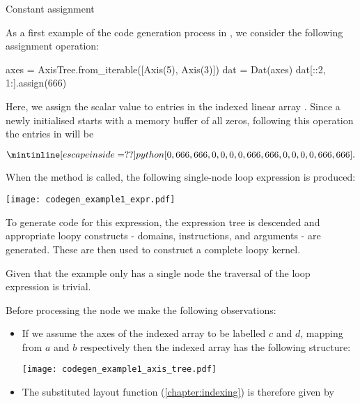 \documentclass[thesis]{subfiles}
\begin{document}
\begin{example}{Constant assignment}
\label{example:assign_codegen}

As a first example of the code generation process in , we consider the following assignment operation:

\begin{pyinline}
  axes = AxisTree.from_iterable([Axis(5), Axis(3)])
  dat = Dat(axes)
  dat[::2, 1:].assign(666)
\end{pyinline}

\noindent
Here, we assign the scalar value  to entries in the indexed linear array .
Since a newly initialised  starts with a memory buffer of all zeros, following this operation the entries in  will be

\begin{equation*}
  \pycode{[0, 666, 666, 0, 0, 0, 0, 666, 666, 0, 0, 0, 0, 666, 666]}.
\end{equation*}

When the  method is called, the following single-node loop expression is produced:

\begin{center}
  \texttt{[image: codegen\_example1\_expr.pdf]}
\end{center}

To generate code for this expression, the expression tree is descended and appropriate loopy constructs - domains, instructions, and arguments - are generated.
These are then used to construct a complete loopy kernel.

Given that the example only has a single node the traversal of the loop expression is trivial.

Before processing the  node we make the following observations:

\begin{itemize}
  \item
    If we assume the axes of the indexed array to be labelled $c$ and $d$, mapping from $a$ and $b$ respectively then the indexed array has the following structure:

    \begin{center}
      \texttt{[image: codegen\_example1\_axis\_tree.pdf]}
    \end{center}

  \item
    The substituted layout function (\cref{chapter:indexing}) is therefore given by


\end{itemize}
\end{example}
\end{document}

